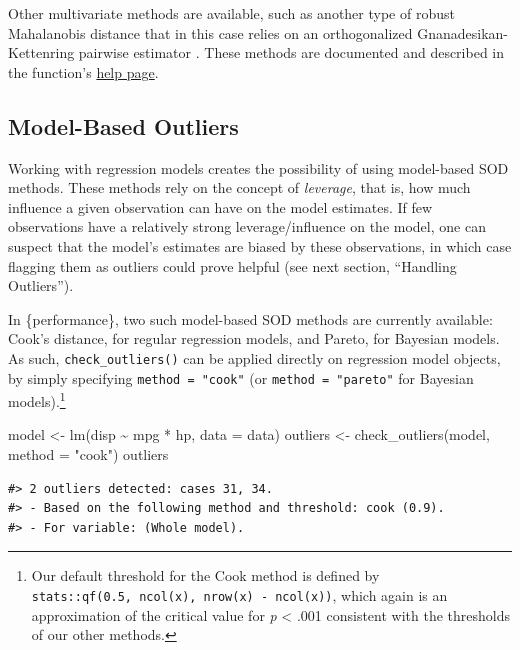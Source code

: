 \documentclass[mathematics,article,submit,moreauthors,pdftex]{mdpi}
\newenvironment{Shaded}{\begin{snugshade}}{\end{snugshade}}
\newcommand{\AttributeTok}[1]{\textcolor[rgb]{0.77,0.63,0.00}{#1}}
\newcommand{\FunctionTok}[1]{\textcolor[rgb]{0.00,0.00,0.00}{#1}}
\newcommand{\NormalTok}[1]{#1}
\newcommand{\OtherTok}[1]{\textcolor[rgb]{0.56,0.35,0.01}{#1}}
\newcommand{\SpecialCharTok}[1]{\textcolor[rgb]{0.00,0.00,0.00}{#1}}
\newcommand{\StringTok}[1]{\textcolor[rgb]{0.31,0.60,0.02}{#1}}
\begin{document}
Other multivariate methods are available, such as another type of robust
Mahalanobis distance that in this case relies on an orthogonalized
Gnanadesikan-Kettenring pairwise estimator
\citep{gnanadesikan1972robust}. These methods are documented and
described in the function's
\href{https://easystats.github.io/performance/reference/check_outliers.html}{help
page}.

\hypertarget{model-based-outliers}{%
\subsection{Model-Based Outliers}\label{model-based-outliers}}

Working with regression models creates the possibility of using
model-based SOD methods. These methods rely on the concept of
\emph{leverage}, that is, how much influence a given observation can
have on the model estimates. If few observations have a relatively
strong leverage/influence on the model, one can suspect that the model's
estimates are biased by these observations, in which case flagging them
as outliers could prove helpful (see next section, ``Handling
Outliers'').

In \{performance\}, two such model-based SOD methods are currently
available: Cook's distance, for regular regression models, and Pareto,
for Bayesian models. As such, \texttt{check\_outliers()} can be applied
directly on regression model objects, by simply specifying
\texttt{method\ =\ "cook"} (or \texttt{method\ =\ "pareto"} for Bayesian
models).\footnote{Our default threshold for the Cook method is defined
  by \texttt{stats::qf(0.5,\ ncol(x),\ nrow(x)\ -\ ncol(x))}, which
  again is an approximation of the critical value for \emph{p}
  \textless{} .001 consistent with the thresholds of our other methods.}

\begin{Shaded}
\begin{Highlighting}[]
\NormalTok{model }\OtherTok{\textless{}{-}} \FunctionTok{lm}\NormalTok{(disp }\SpecialCharTok{\textasciitilde{}}\NormalTok{ mpg }\SpecialCharTok{*}\NormalTok{ hp, }\AttributeTok{data =}\NormalTok{ data)}
\NormalTok{outliers }\OtherTok{\textless{}{-}} \FunctionTok{check\_outliers}\NormalTok{(model, }\AttributeTok{method =} \StringTok{"cook"}\NormalTok{)}
\NormalTok{outliers}
\end{Highlighting}
\end{Shaded}

\begin{verbatim}
#> 2 outliers detected: cases 31, 34.
#> - Based on the following method and threshold: cook (0.9).
#> - For variable: (Whole model).
\end{verbatim}
\end{document}
